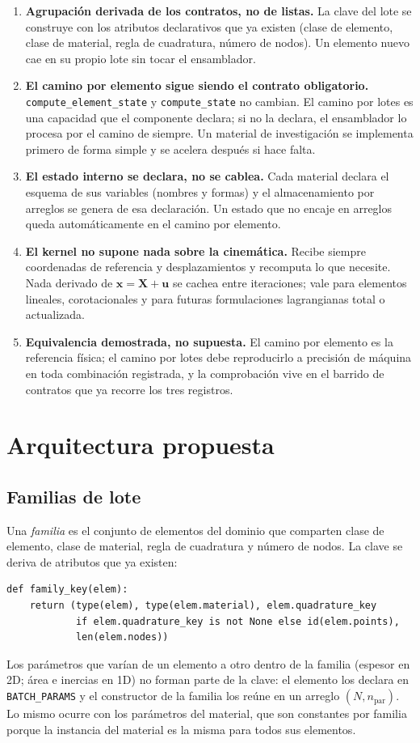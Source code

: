 \documentclass[11pt,letterpaper,oneside]{article}
\newcommand{\code}[1]{\texttt{#1}}
\begin{document}
\begin{enumerate}[nosep]
  \item \textbf{Agrupación derivada de los contratos, no de listas.} La clave del lote se construye con los atributos declarativos que ya existen (clase de elemento, clase de material, regla de cuadratura, número de nodos). Un elemento nuevo cae en su propio lote sin tocar el ensamblador.
  \item \textbf{El camino por elemento sigue siendo el contrato obligatorio.} \code{compute\_element\_state} y \code{compute\_state} no cambian. El camino por lotes es una capacidad que el componente declara; si no la declara, el ensamblador lo procesa por el camino de siempre. Un material de investigación se implementa primero de forma simple y se acelera después si hace falta.
  \item \textbf{El estado interno se declara, no se cablea.} Cada material declara el esquema de sus variables (nombres y formas) y el almacenamiento por arreglos se genera de esa declaración. Un estado que no encaje en arreglos queda automáticamente en el camino por elemento.
  \item \textbf{El kernel no supone nada sobre la cinemática.} Recibe siempre coordenadas de referencia y desplazamientos y recomputa lo que necesite. Nada derivado de $\mathbf x = \mathbf X + \mathbf u$ se cachea entre iteraciones; vale para elementos lineales, corotacionales y para futuras formulaciones lagrangianas total o actualizada.
  \item \textbf{Equivalencia demostrada, no supuesta.} El camino por elemento es la referencia física; el camino por lotes debe reproducirlo a precisión de máquina en toda combinación registrada, y la comprobación vive en el barrido de contratos que ya recorre los tres registros.
\end{enumerate}

\section{Arquitectura propuesta}

\subsection{Familias de lote}

Una \emph{familia} es el conjunto de elementos del dominio que comparten clase de elemento, clase de material, regla de cuadratura y número de nodos. La clave se deriva de atributos que ya existen:
\begin{lstlisting}
def family_key(elem):
    return (type(elem), type(elem.material), elem.quadrature_key
            if elem.quadrature_key is not None else id(elem.points),
            len(elem.nodes))
\end{lstlisting}
Los parámetros que varían de un elemento a otro dentro de la familia (espesor en 2D; área e inercias en 1D) no forman parte de la clave: el elemento los declara en \code{BATCH\_PARAMS} y el constructor de la familia los reúne en un arreglo $(N, n_{\text{par}})$. Lo mismo ocurre con los parámetros del material, que son constantes por familia porque la instancia del material es la misma para todos sus elementos.
\end{document}
